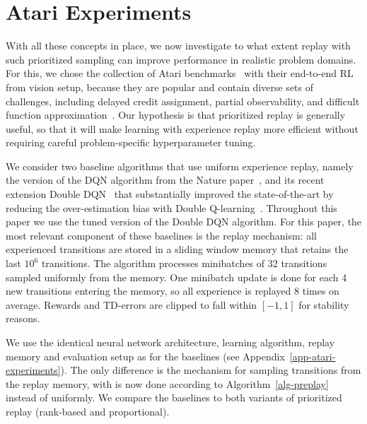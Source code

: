 \documentclass[a4paper]{article}
\begin{document}
\section{Atari Experiments} 

With all these concepts in place, 
we now investigate to what extent replay with such prioritized sampling 
can improve performance in realistic problem domains. 
For this, we chose the collection of Atari benchmarks~\citep{bellemare2012arcade} with their end-to-end RL from vision setup,
because they are popular and contain diverse sets of challenges, including delayed credit assignment, partial observability, and difficult function approximation~\citep{dqn-nature,double-dqn}.
Our hypothesis is that prioritized replay is generally useful, so that it will make learning with experience replay more efficient
without requiring careful problem-specific hyperparameter tuning.

We consider two baseline algorithms that use uniform experience replay, namely the version of the DQN algorithm from the Nature paper~\citep{dqn-nature},
and its recent extension Double DQN~\citep{double-dqn} that substantially improved the state-of-the-art by reducing the over-estimation bias with Double Q-learning~\citep{double-q}.  Throughout this paper we use the tuned version of the Double DQN algorithm.
For this paper, the most relevant component of these baselines is the replay mechanism:
all experienced transitions are stored in a sliding window memory that retains the
last $10^6$ transitions.
The algorithm processes minibatches of 32 transitions sampled uniformly from the memory. One minibatch update is done for each 4 new transitions entering the memory, so all experience is replayed 8 times on average. Rewards and TD-errors are clipped to fall within $[-1, 1]$ for stability reasons.

We use the identical neural network architecture, learning algorithm, replay memory and evaluation setup as for the baselines (see Appendix~\ref{app-atari-experiments}).
The only difference is the mechanism for sampling transitions from the replay memory, with is now done according to Algorithm~\ref{alg-preplay} instead of uniformly.
We compare the baselines to both variants of prioritized replay (rank-based and proportional).
\end{document}
